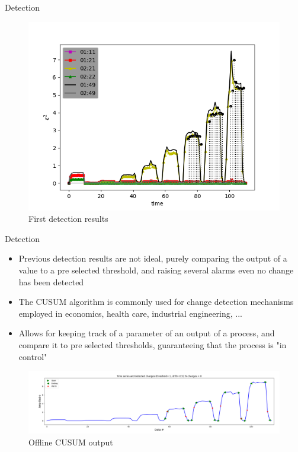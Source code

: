 \documentclass[aspectratio=43]{beamer}
\begin{document}
\begin{frame}{Detection}
    \begin{figure}
        \includegraphics[width=.8\textwidth]{meter_eleph/detect_dumb}
        \caption{First detection results}
    \end{figure}
\end{frame}

\begin{frame}{Detection}
    \begin{itemize}

        \item Previous detection results are not ideal, purely comparing the output
            of a value to a pre selected threshold, and raising several alarms
            even no change has been detected


        \item The CUSUM algorithm is commonly used for change detection mechanisms employed
            in economics, health care, industrial engineering, ...
        \item Allows for keeping track of a parameter of an output of a process, and 
            compare it to pre selected thresholds, guaranteeing that the process is "in control"
    \end{itemize}

    \begin{figure}
        \includegraphics[width=1\textwidth]{meter_eleph/offline_cusum_output}
        \caption{Offline CUSUM output}
    \end{figure}
\end{frame}
\end{document}
